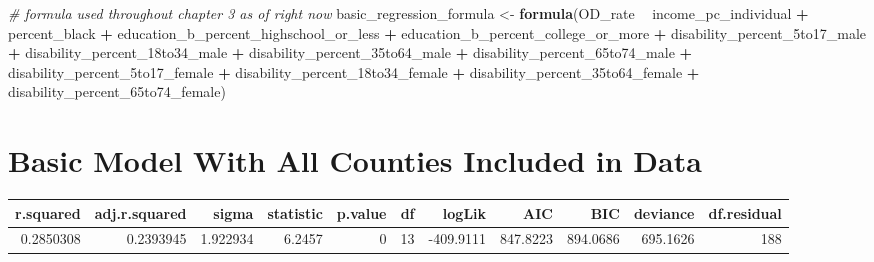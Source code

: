 \documentclass[12pt,twoside]{reedthesis}
\newenvironment{Shaded}{\begin{snugshade}}{\end{snugshade}}
\newcommand{\CommentTok}[1]{\textcolor[rgb]{0.56,0.35,0.01}{\textit{#1}}}
\newcommand{\DataTypeTok}[1]{\textcolor[rgb]{0.13,0.29,0.53}{#1}}
\newcommand{\FloatTok}[1]{\textcolor[rgb]{0.00,0.00,0.81}{#1}}
\newcommand{\KeywordTok}[1]{\textcolor[rgb]{0.13,0.29,0.53}{\textbf{#1}}}
\newcommand{\NormalTok}[1]{#1}
\newcommand{\OperatorTok}[1]{\textcolor[rgb]{0.81,0.36,0.00}{\textbf{#1}}}
\newcommand{\OtherTok}[1]{\textcolor[rgb]{0.56,0.35,0.01}{#1}}
\newcommand{\StringTok}[1]{\textcolor[rgb]{0.31,0.60,0.02}{#1}}
\begin{document}
\begin{Shaded}
\begin{Highlighting}[]
\CommentTok{# formula used throughout chapter 3 as of right now}
\NormalTok{basic_regression_formula <-}\StringTok{ }\KeywordTok{formula}\NormalTok{(OD_rate }\OperatorTok{~}\StringTok{ }\NormalTok{income_pc_individual }\OperatorTok{+}\StringTok{ }\NormalTok{percent_black }\OperatorTok{+}\StringTok{ }\NormalTok{education_b_percent_highschool_or_less }\OperatorTok{+}\StringTok{ }\NormalTok{education_b_percent_college_or_more }\OperatorTok{+}\StringTok{ }\NormalTok{disability_percent_5to17_male }\OperatorTok{+}\StringTok{ }\NormalTok{disability_percent_18to34_male }\OperatorTok{+}\StringTok{ }\NormalTok{disability_percent_35to64_male }\OperatorTok{+}\StringTok{ }\NormalTok{disability_percent_65to74_male }\OperatorTok{+}\StringTok{ }\NormalTok{disability_percent_5to17_female }\OperatorTok{+}\StringTok{ }\NormalTok{disability_percent_18to34_female }\OperatorTok{+}\StringTok{ }\NormalTok{disability_percent_35to64_female }\OperatorTok{+}\StringTok{ }\NormalTok{disability_percent_65to74_female)}
\end{Highlighting}
\end{Shaded}
\hypertarget{basic-model-with-all-counties-included-in-data}{%
\section{Basic Model With All Counties Included in Data}\label{basic-model-with-all-counties-included-in-data}}
\begin{Shaded}
\end{Shaded}
\begin{tabular}{r|r|r|r|r|r|r|r|r|r|r}
\hline
r.squared & adj.r.squared & sigma & statistic & p.value & df & logLik & AIC & BIC & deviance & df.residual\\
\hline
0.2850308 & 0.2393945 & 1.922934 & 6.2457 & 0 & 13 & -409.9111 & 847.8223 & 894.0686 & 695.1626 & 188\\
\hline
\end{tabular}
\begin{Shaded}
\end{Shaded}
\end{document}

